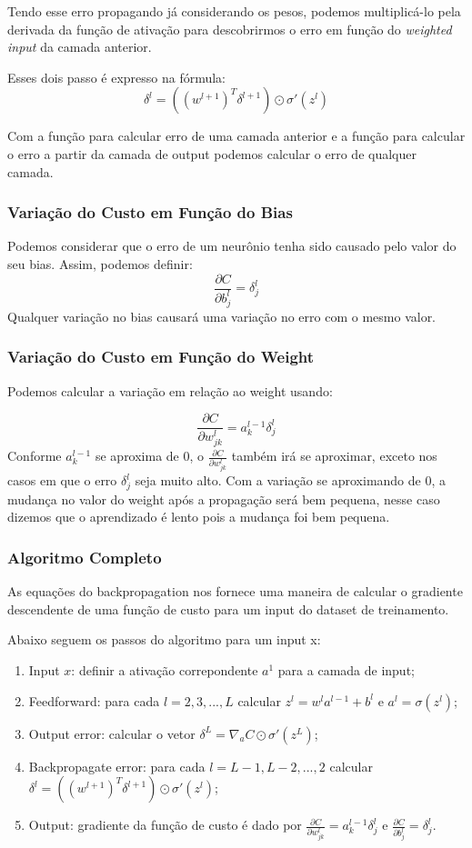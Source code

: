 \documentclass[11pt,a4paper,leqno]{article}
\begin{document}
Tendo esse erro propagando já considerando os pesos, podemos multiplicá-lo pela derivada da função de ativação para descobrirmos o erro em função do \emph{weighted input} da camada anterior.

Esses dois passo é expresso na fórmula:
\[
	\delta^l = \left( (w^{l+1})^T \delta^{l+1} \right) \odot \sigma'(z^l)
\]

Com a função para calcular erro de uma camada anterior e a função para calcular o erro a partir da camada de output podemos calcular o erro de qualquer camada.


\subsubsection{Variação do Custo em Função do Bias}
Podemos considerar que o erro de um neurônio tenha sido causado pelo valor do seu bias.
Assim, podemos definir:
\[
	\frac{\partial C}{\partial b^l_j} = \delta^l_j
\]
Qualquer variação no bias causará uma variação no erro com o mesmo valor.


\subsubsection{Variação do Custo em Função do Weight}
Podemos calcular a variação em relação ao weight usando:

\[
	\frac{\partial C}{\partial w^l_{jk}} = a^{l-1}_k \delta^l_j
\]
Conforme $a^{l-1}_k$ se aproxima de 0, o $\frac{\partial C}{\partial w^l_{jk}}$ também irá se aproximar, exceto nos casos em que o erro $\delta^l_j$ seja muito alto.
Com a variação se aproximando de 0, a mudança no valor do weight após a propagação será bem pequena, nesse caso dizemos que o aprendizado é lento pois a mudança foi bem pequena.



\subsubsection{Algoritmo Completo}
As equações do backpropagation nos fornece uma maneira de calcular o gradiente descendente de uma função de custo para um input do dataset de treinamento.

Abaixo seguem os passos do algoritmo para um input x:
\begin{enumerate}
\item Input $x$: definir a ativação correpondente $a^1$ para a camada de input;
\item Feedforward: para cada $l = 2, 3, ..., L$ calcular $z^l = w^l a^{l-1} + b^l$ e $a^l = \sigma(z^l)$;
\item Output error: calcular o vetor $\delta^L = \nabla_a C \odot \sigma'(z^L)$;
\item Backpropagate error: para cada $l = L-1, L-2, ..., 2$ calcular $\delta^l = \left( (w^{l+1})^T \delta^{l+1} \right) \odot \sigma'(z^l)$;
\item Output: gradiente da função de custo é dado por $\frac{\partial C}{\partial w^l_{jk}} = a^{l-1}_k \delta^l_j$ e $\frac{\partial C}{\partial b^l_j} = \delta^l_j$.
\end{enumerate}
\end{document}
